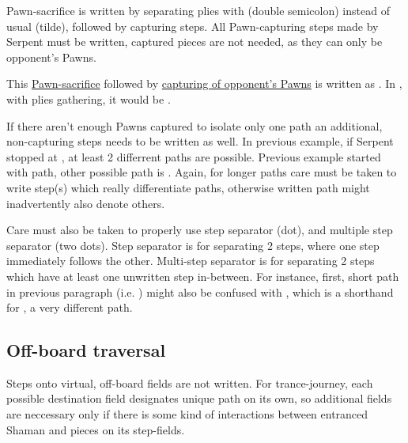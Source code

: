 Pawn-sacrifice is written by separating plies with \alg{;;} (double semicolon) instead of
usual \alg{\~{}} (tilde), followed by capturing steps. All Pawn-capturing steps made by
Serpent must be written, captured pieces are not needed, as they can only be opponent's
Pawns.

This \hyperref[fig:scn_tr_27_pawn_sacrifice_init]{Pawn-sacrifice} followed by
\hyperref[fig:scn_tr_28_pawn_sacrifice_end]{capturing of opponent's Pawns} is written as
 \newline
{}. \newline
In , with plies gathering, it would be \newline
\alg{[Ss14-n15]\~{}[An15-n11];;} \newline
\alg{[Sn15..n17*..n19*.m20*.n21*.o20*.p21*.q20*]}.

If there aren't enough Pawns captured to isolate only one path an additional, non-capturing
steps needs to be written as well. In previous example, if Serpent stopped at , at
least 2 differrent paths are possible. Previous example started with
 path, other possible path is .
Again, for longer paths care must be taken to write step(s) which really differentiate paths,
otherwise written path might inadvertently also denote others.

Care must also be taken to properly use step separator  (dot), and multiple step
separator  (two dots). Step separator  is for separating 2 steps, where one
step immediately follows the other. Multi-step separator  is for separating 2 steps
which have at least one unwritten step in-between. For instance, first, short path in
previous paragraph (i.e. ) might also be confused with
, which is a shorthand for
, a very different path.

\subsection*{Off-board traversal}
\label{sec:Appendix/Notation/Off-board traversal}

Steps onto virtual, off-board fields are not written. For trance-journey, each possible
destination field designates unique path on its own, so additional fields are neccessary
only if there is some kind of interactions between entranced Shaman and pieces on its
step-fields.

